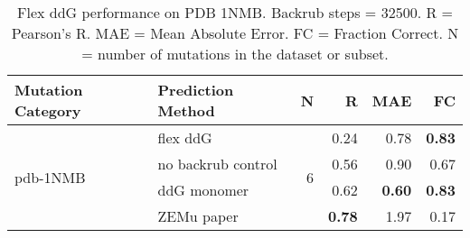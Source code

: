 \begin{table}
  \begin{tabular}{llrrrr}
\toprule
Mutation Category &   Prediction Method &  N &    R &  MAE &   FC \\
\midrule
 \multirow{ 4}{*}{pdb-1NMB} & flex ddG & \multirow{ 4}{*}{6} & 0.24 & 0.78 & \textbf{0.83}  \\
 & no backrub control & & 0.56 & 0.90 & 0.67  \\
 & ddG monomer & & 0.62 & \textbf{0.60} & \textbf{0.83}  \\
 & ZEMu paper & & \textbf{0.78} & 1.97 & 0.17  \\
\bottomrule
\end{tabular}
  \caption[Flex ddG performance on PDB 1NMB]{
    Flex ddG performance on PDB 1NMB. Backrub steps = 32500. R = Pearson's R. MAE = Mean Absolute Error. FC = Fraction Correct. N = number of mutations in the dataset or subset.
  } \label{tab:table-pdb-1NMB}
\end{table}
